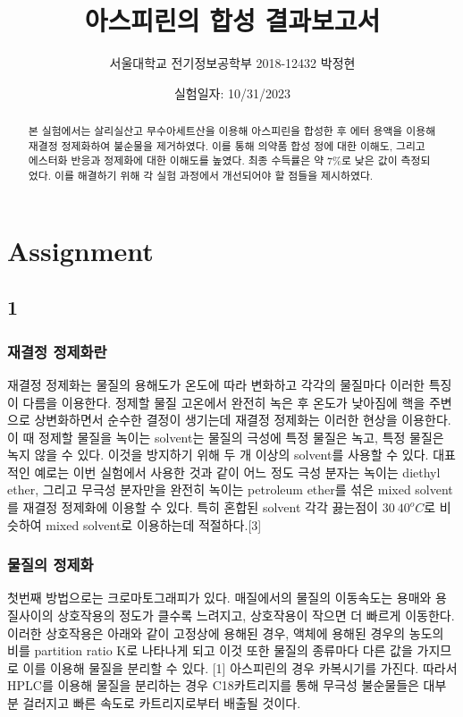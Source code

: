 \documentclass[%
 reprint,
 amsmath,amssymb,
 aps,
]{revtex4-2}
\begin{document}
\title{아스피린의 합성 결과보고서}

\author{서울대학교 전기정보공학부 2018-12432 박정현}
\date{실험일자: 10/31/2023}%

\begin{abstract}
본 실험에서는 살리실산고 무수아세트산을 이용해 아스피린을 합성한 후 에터 용액을 이용해 재결정 정제화하여 불순물을 제거하였다. 이를 통해 의약품 합성 정에 대한 이해도, 그리고 에스터화 반응과 정제화에 대한 이해도를 높였다. 최종 수득률은 약 7\%로 낮은 값이 측정되었다. 이를 해결하기 위해 각 실험 과정에서 개선되어야 할 점들을 제시하였다.
\end{abstract}

\maketitle


\section{\label{sec:level1}Assignment}
\subsection{\label{sec:level2}1}
\subsubsection{\label{sec:level3}재결정 정제화란}
재결정 정제화는 물질의 용해도가 온도에 따라 변화하고 각각의 물질마다 이러한 특징이 다름을 이용한다. 정제할 물질 고온에서 완전히 녹은 후 온도가 낮아짐에 핵을 주변으로 상변화하면서 순수한 결정이 생기는데 재결정 정제화는 이러한 현상을 이용한다. 이 때 정제할 물질을 녹이는 solvent는 물질의 극성에 특정 물질은 녹고, 특정 물질은 녹지 않을 수 있다. 이것을 방지하기 위해 두 개 이상의 solvent를 사용할 수 있다. 대표적인 예로는 이번 실험에서 사용한 것과 같이 어느 정도 극성 분자는 녹이는 diethyl ether, 그리고 무극성 분자만을 완전히 녹이는 petroleum ether를 섞은 mixed solvent를 재결정 정제화에 이용할 수 있다. 특히 혼합된 solvent 각각 끓는점이 $30~40^{o}C$로 비슷하여 mixed solvent로 이용하는데 적절하다.[3]

\subsubsection{\label{sec:level3}물질의 정제화}
 첫번째 방법으로는 크로마토그래피가 있다. 매질에서의 물질의 이동속도는 용매와 용질사이의 상호작용의 정도가 클수록 느려지고, 상호작용이 작으면 더 빠르게 이동한다. 이러한 상호작용은 아래와 같이 고정상에 용해된 경우, 액체에 용해된 경우의 농도의 비를 partition ratio K로 나타나게 되고 이것 또한 물질의 종류마다 다른 값을 가지므로 이를 이용해 물질을 분리할 수 있다. [1] 아스피린의 경우 카복시기를 가진다. 따라서 HPLC를 이용해 물질을 분리하는 경우 C18카트리지를 통해 무극성 불순물들은 대부분 걸러지고 빠른 속도로 카트리지로부터 배출될 것이다. 
\end{document}
